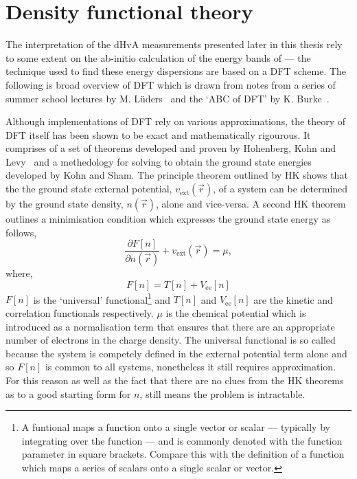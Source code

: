 
\section{Density functional theory}
\label{Sec:Theo:Dft}

The interpretation of the \ac{dHvA} measurements presented later in this thesis rely to some extent on the ab-initio calculation of the energy bands of \BaFeP --- the technique used to find these energy dispersions are based on a \ac{DFT} scheme. The following is broad overview of \ac{DFT} which is drawn from notes from a series of summer school lectures by M. L\"uders~\cite{Luders2010} and the `ABC of DFT' by K. Burke~\cite{Burke2003}.

 Although implementations of \ac{DFT} rely on various approximations, the theory of \ac{DFT} itself has been shown to be exact and mathematically rigourous. It comprises of a set of theorems developed and proven by Hohenberg, Kohn and Levy~\cite{Hohenberg1964, Levy1979} and a methedology for solving to obtain the ground state energies developed by Kohn and Sham. The principle theorem outlined by \ac{HK} shows that the the ground state external potential, $v_{\textrm{ext}}(\vec{r})$, of a system can be determined by the ground state density, $n(\vec{r})$, alone and vice-versa. A second \ac{HK} theorem outlines a minimisation condition which expresses the ground state energy as follows,
\begin{equation}
\label{Eqn:Theo:HKMinimisation}
\frac{\partial F[n]}{\partial n(\vec{r})} + v_{\textrm{ext}}(\vec{r}) = \mu,
\end{equation}
where,
\begin{equation}
F[n] = T[n] + V_{\textrm{ee}}[n]
\end{equation}
$F[n]$ is the `universal' functional\footnote{A funtional maps a function onto a single vector or scalar --- typically by integrating over the function --- and is commonly denoted with the function parameter in square brackets. Compare this with the definition of a function which maps a series of scalars onto a single scalar or vector.} and $T[n]$ and $V_{\textrm{ee}}[n]$ are the kinetic and correlation functionals respectively. $\mu$ is the chemical potential which is introduced as a normalisation term that ensures that there are an appropriate number of electrons in the charge density. The universal functional is so called because the system is competely defined in the external potential term alone and so $F[n]$ is common to all systems, nonetheless it still requires approximation. For this reason as well as the fact that there are no clues from the \ac{HK} theorems as to a good starting form for $n$, still means the problem is intractable.

